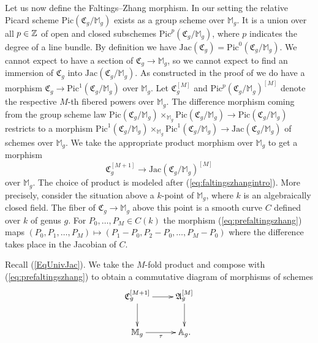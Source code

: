 Let us now define the Faltings--Zhang morphism. 
In our setting the relative Picard scheme
$\mathrm{Pic}(\mathfrak{C}_g/\mathbb{M}_g)$ exists as a group scheme
over $\mathbb{M}_g$. It is a union over all $p\in{\mathbb{Z}}$
of open and closed subschemes
$\mathrm{Pic}^p(\mathfrak{C}_g/\mathbb{M}_g)$, where $p$ indicates the
degree of a line bundle.
By definition we have
$\mathrm{Jac}(\mathfrak{C}_g) =
\mathrm{Pic}^0(\mathfrak{C}_g/\mathbb{M}_g)$.
We cannot expect to
have a section of $\mathfrak{C}_g\rightarrow\mathbb{M}_g$,
so we cannot expect to find an immersion of $\mathfrak{C}_g$
into $\mathrm{Jac}(\mathfrak{C}_g/\mathbb{M}_g)$. 
As constructed in the proof of
\cite[Proposition~6.9]{MFK:GIT94} we
do have a morphism $\mathfrak{C}_g \rightarrow
\mathrm{Pic}^1(\mathfrak{C}_g/\mathbb{M}_g)$ over $\mathbb{M}_g$.
Let $\mathfrak{C}_g^{[M]}$ and
$\mathrm{Pic}^p(\mathfrak{C}_g/\mathbb{M}_g)^{[M]}$ denote the
respective $M$-th fibered powers over $\mathbb{M}_g$. 
The difference morphism coming from the group scheme law
$\mathrm{Pic}(\mathfrak{C}_g/\mathbb{M}_g)\times_{\mathbb{M}_g}
\mathrm{Pic}(\mathfrak{C}_g/\mathbb{M}_g)\rightarrow
\mathrm{Pic}(\mathfrak{C}_g/\mathbb{M}_g)$ restricts to a morphism
$\mathrm{Pic}^1(\mathfrak{C}_g/\mathbb{M}_g)\times_{\mathbb{M}_g}
\mathrm{Pic}^1(\mathfrak{C}_g/\mathbb{M}_g)
\rightarrow
\mathrm{Jac}(\mathfrak{C}_g/\mathbb{M}_g)$ of schemes
over $\mathbb{M}_g$.
We take the appropriate  product morphism over $\mathbb{M}_g$ to get a
morphism 
\begin{equation}
  \label{eq:prefaltingszhang}
  \mathfrak{C}_g^{[M+1]} \rightarrow
 \mathrm{Jac}(\mathfrak{C}_g/\mathbb{M}_g)^{[M]}
\end{equation}
over $\mathbb{M}_g$. The choice of product is modeled after
(\ref{eq:faltingszhangintro}). More precisely, consider the situation
above a $k$-point of $\mathbb{M}_g$, where $k$ is an algebraically
closed field. The fiber of $\mathfrak{C}_g \rightarrow \mathbb{M}_g$ above this point is a smooth curve $C$
defined over $k$ of genus $g$. For $P_0,\ldots,P_M\in C(k)$ the
morphism (\ref{eq:prefaltingszhang}) maps $(P_0,P_1,\ldots,P_M)
\mapsto (P_1-P_0,P_2-P_0,\ldots,P_M-P_0)$ where the difference takes
place in the Jacobian of $C$. %

Recall (\ref{EqUnivJac}). We take the $M$-fold product and compose
with (\ref{eq:prefaltingszhang}) to obtain a commutative diagram of
morphisms of schemes %
\begin{equation}
  \label{DefFaltingsZhang}
  \begin{aligned}
    \xymatrix{
      \mathfrak{C}_g^{[M+1]}\ar[r] \ar[d] &
      \mathfrak{A}_g^{[M]}
      \ar[d] \\  
      \mathbb{M}_g \ar[r]_{\tau} & \mathbb{A}_g.
    }
  \end{aligned}
\end{equation}

